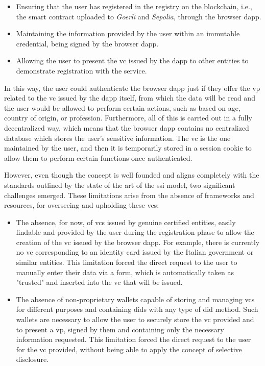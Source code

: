 \begin{itemize}
  \item Ensuring that the user has registered in the registry on the blockchain, i.e., the smart contract uploaded to \textit{Goerli} and \textit{Sepolia}, through the browser \gls{dapp}.
  \item Maintaining the information provided by the user within an immutable credential, being signed by the browser \gls{dapp}.
  \item Allowing the user to present the \gls{vc} issued by the \gls{dapp} to other entities to demonstrate registration with the service.
\end{itemize}

In this way, the user could authenticate the browser \gls{dapp} just if they offer the \gls{vp} related to the \gls{vc} issued by the \gls{dapp} itself, from which the data will be 
read and the user would be allowed to perform certain actions, such as based on age, country of origin, or profession. Furthermore, all of this is carried out in a fully 
decentralized way, which means that the browser \gls{dapp} contains no centralized database which stores the user's sensitive information. The \gls{vc} is the one maintained by 
the user, and then it is temporarily stored in a session cookie to allow them to perform certain functions once authenticated.

However, even though the concept is well founded and aligns completely with the standards outlined by the state of the art of the \gls{ssi} model, two significant challenges 
emerged. These limitations arise from the absence of frameworks and resources, for overseeing and upholding these \gls{vc}s:

\begin{itemize}
  \item The absence, for now, of \gls{vc}s issued by genuine certified entities, easily findable and provided by the user during the registration phase to allow the creation of 
  the \gls{vc} issued by the browser \gls{dapp}. For example, there is currently no \gls{vc} corresponding to an identity card issued by the Italian government or similar
  entities. This limitation forced the direct request to the user to manually enter their data via a form, which is automatically taken as "trusted" and inserted into the 
  \gls{vc} that will be issued.
  \item The absence of non-proprietary wallets capable of storing and managing \gls{vc}s for different purposes and containing \gls{did}s with any type of \gls{did} method. Such wallets are 
  necessary to allow the user to securely store the \gls{vc} provided and to present a \gls{vp}, signed by them and containing only the necessary information requested. This limitation 
  forced the direct request to the user for the \gls{vc} provided, without being able to apply the concept of selective disclosure.
\end{itemize}

